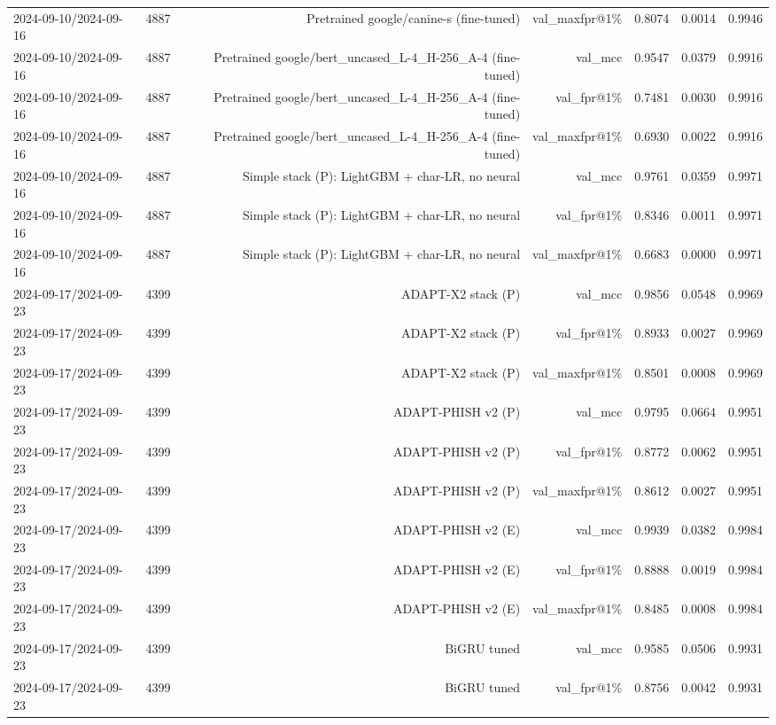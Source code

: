 \begin{table}[t]
\begin{tabular}{llrrrrr}
2024-09-10/2024-09-16 & 4887 & Pretrained google/canine-s (fine-tuned) & val\_maxfpr@1\% & 0.8074 & 0.0014 & 0.9946 \\
2024-09-10/2024-09-16 & 4887 & Pretrained google/bert\_uncased\_L-4\_H-256\_A-4 (fine-tuned) & val\_mcc & 0.9547 & 0.0379 & 0.9916 \\
2024-09-10/2024-09-16 & 4887 & Pretrained google/bert\_uncased\_L-4\_H-256\_A-4 (fine-tuned) & val\_fpr@1\% & 0.7481 & 0.0030 & 0.9916 \\
2024-09-10/2024-09-16 & 4887 & Pretrained google/bert\_uncased\_L-4\_H-256\_A-4 (fine-tuned) & val\_maxfpr@1\% & 0.6930 & 0.0022 & 0.9916 \\
2024-09-10/2024-09-16 & 4887 & Simple stack (P): LightGBM + char-LR, no neural & val\_mcc & 0.9761 & 0.0359 & 0.9971 \\
2024-09-10/2024-09-16 & 4887 & Simple stack (P): LightGBM + char-LR, no neural & val\_fpr@1\% & 0.8346 & 0.0011 & 0.9971 \\
2024-09-10/2024-09-16 & 4887 & Simple stack (P): LightGBM + char-LR, no neural & val\_maxfpr@1\% & 0.6683 & 0.0000 & 0.9971 \\
2024-09-17/2024-09-23 & 4399 & ADAPT-X2 stack (P) & val\_mcc & 0.9856 & 0.0548 & 0.9969 \\
2024-09-17/2024-09-23 & 4399 & ADAPT-X2 stack (P) & val\_fpr@1\% & 0.8933 & 0.0027 & 0.9969 \\
2024-09-17/2024-09-23 & 4399 & ADAPT-X2 stack (P) & val\_maxfpr@1\% & 0.8501 & 0.0008 & 0.9969 \\
2024-09-17/2024-09-23 & 4399 & ADAPT-PHISH v2 (P) & val\_mcc & 0.9795 & 0.0664 & 0.9951 \\
2024-09-17/2024-09-23 & 4399 & ADAPT-PHISH v2 (P) & val\_fpr@1\% & 0.8772 & 0.0062 & 0.9951 \\
2024-09-17/2024-09-23 & 4399 & ADAPT-PHISH v2 (P) & val\_maxfpr@1\% & 0.8612 & 0.0027 & 0.9951 \\
2024-09-17/2024-09-23 & 4399 & ADAPT-PHISH v2 (E) & val\_mcc & 0.9939 & 0.0382 & 0.9984 \\
2024-09-17/2024-09-23 & 4399 & ADAPT-PHISH v2 (E) & val\_fpr@1\% & 0.8888 & 0.0019 & 0.9984 \\
2024-09-17/2024-09-23 & 4399 & ADAPT-PHISH v2 (E) & val\_maxfpr@1\% & 0.8485 & 0.0008 & 0.9984 \\
2024-09-17/2024-09-23 & 4399 & BiGRU tuned & val\_mcc & 0.9585 & 0.0506 & 0.9931 \\
2024-09-17/2024-09-23 & 4399 & BiGRU tuned & val\_fpr@1\% & 0.8756 & 0.0042 & 0.9931 \\

\end{tabular}
\end{table}
